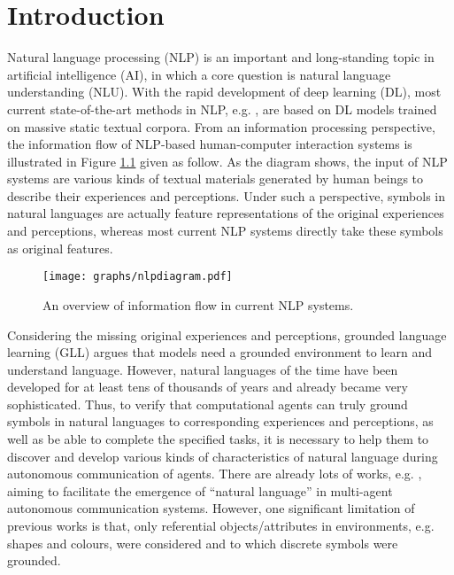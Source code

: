 \chapter{Introduction}
\label{ch1:intro}

Natural language processing (NLP) is an important and long-standing topic in artificial intelligence (AI), in which a core question is natural language understanding (NLU). With the rapid development of deep learning (DL), most current state-of-the-art methods in NLP, e.g. \cite{socher2013recursive, word2vec2013, kim2014cnn}, are based on DL models trained on massive static textual corpora. From an information processing perspective, the information flow of NLP-based human-computer interaction systems is illustrated in Figure \ref{fig1:nlpdiagram} given as follow. As the diagram shows, the input of NLP systems are various kinds of textual materials generated by human beings to describe their experiences and perceptions. Under such a perspective, symbols in natural languages are actually feature representations of the original experiences and perceptions, whereas most current NLP systems directly take these symbols as original features.

\begin{figure}[!h]
  \centering
  \texttt{[image: graphs/nlpdiagram.pdf]}
  \caption{An overview of information flow in current NLP systems.}
  \label{fig1:nlpdiagram}
\end{figure}

Considering the missing original experiences and perceptions, grounded language learning (GLL) argues that models need a grounded environment to learn and understand language\cite{matuszek2018grounded}. However, natural languages of the time have been developed for at least tens of thousands of years\cite{berwick2016only} and already became very sophisticated. Thus, to verify that computational agents can truly ground symbols in natural languages to corresponding experiences and perceptions, as well as be able to complete the specified tasks, it is necessary to help them to discover and develop various kinds of characteristics of natural language during autonomous communication of agents. There are already lots of works, e.g. \cite{batali1998computational, christiansen2003language, smith2003complex, hill2017understanding, havrylov2017emergence, yu2018interactive, kottur2017natural}, aiming to facilitate the emergence of ``natural language'' in multi-agent autonomous communication systems. However, one significant limitation of previous works is that, only referential objects/attributes in environments, e.g. shapes and colours, were considered and to which discrete symbols were grounded.

